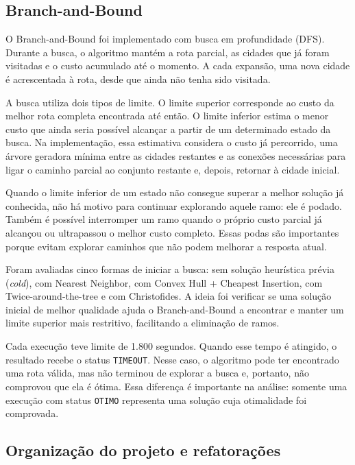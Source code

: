 \documentclass[12pt]{article}
\begin{document}
\subsection{Branch-and-Bound}

O Branch-and-Bound foi implementado com busca em profundidade (DFS). Durante a busca, o algoritmo mantém a rota parcial, as cidades que já foram visitadas e o custo acumulado até o momento. A cada expansão, uma nova cidade é acrescentada à rota, desde que ainda não tenha sido visitada.

A busca utiliza dois tipos de limite. O limite superior corresponde ao custo da melhor rota completa encontrada até então. O limite inferior estima o menor custo que ainda seria possível alcançar a partir de um determinado estado da busca. Na implementação, essa estimativa considera o custo já percorrido, uma árvore geradora mínima entre as cidades restantes e as conexões necessárias para ligar o caminho parcial ao conjunto restante e, depois, retornar à cidade inicial.

Quando o limite inferior de um estado não consegue superar a melhor solução já conhecida, não há motivo para continuar explorando aquele ramo: ele é podado. Também é possível interromper um ramo quando o próprio custo parcial já alcançou ou ultrapassou o melhor custo completo. Essas podas são importantes porque evitam explorar caminhos que não podem melhorar a resposta atual.

Foram avaliadas cinco formas de iniciar a busca: sem solução heurística prévia (\textit{cold}), com Nearest Neighbor, com Convex Hull + Cheapest Insertion, com Twice-around-the-tree e com Christofides. A ideia foi verificar se uma solução inicial de melhor qualidade ajuda o Branch-and-Bound a encontrar e manter um limite superior mais restritivo, facilitando a eliminação de ramos.

Cada execução teve limite de 1.800 segundos. Quando esse tempo é atingido, o resultado recebe o status \texttt{TIMEOUT}. Nesse caso, o algoritmo pode ter encontrado uma rota válida, mas não terminou de explorar a busca e, portanto, não comprovou que ela é ótima. Essa diferença é importante na análise: somente uma execução com status \texttt{OTIMO} representa uma solução cuja otimalidade foi comprovada.

\subsection{Organização do projeto e refatorações}
\end{document}
